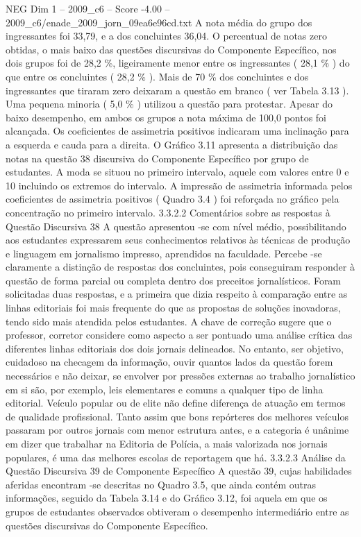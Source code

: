 \begin{textsample}{NEG Dim 1 – 2009\_c6 – Score -4.00 – 2009\_c6/enade\_2009\_jorn\_09ea6e96cd.txt}
A nota média do grupo dos ingressantes foi 33,79, e a dos concluintes 36,04.
O percentual de notas zero obtidas, o mais baixo das questões discursivas do Componente Específico, nos dois grupos foi de 28,2 \%, ligeiramente menor entre os ingressantes ( 28,1 \% ) do que entre os concluintes ( 28,2 \% ).
Mais de 70 \% dos concluintes e dos ingressantes que tiraram zero deixaram a questão em branco ( ver Tabela 3.13 ).
Uma pequena minoria ( 5,0 \% ) utilizou a questão para protestar.
Apesar do baixo desempenho, em ambos os grupos a nota máxima de 100,0 pontos foi alcançada.
Os coeficientes de assimetria positivos indicaram uma inclinação para a esquerda e cauda para a direita.
O Gráfico 3.11 apresenta a distribuição das notas na questão 38 discursiva do Componente Específico por grupo de estudantes.
A moda se situou no primeiro intervalo, aquele com valores entre 0 e 10 incluindo os extremos do intervalo.
A impressão de assimetria informada pelos coeficientes de assimetria positivos ( Quadro 3.4 ) foi reforçada no gráfico pela concentração no primeiro intervalo. 3.3.2.2 Comentários sobre as respostas à Questão Discursiva 38 A questão apresentou -se com nível médio, possibilitando aos estudantes expressarem seus conhecimentos relativos às técnicas de produção e linguagem em jornalismo impresso, aprendidos na faculdade.
Percebe -se claramente a distinção de respostas dos concluintes, pois conseguiram responder à questão de forma parcial ou completa dentro dos preceitos jornalísticos.
Foram solicitadas duas respostas, e a primeira que dizia respeito à comparação entre as linhas editoriais foi mais frequente do que as propostas de soluções inovadoras, tendo sido mais atendida pelos estudantes.
A chave de correção sugere que o professor, corretor considere como aspecto a ser pontuado uma análise crítica das diferentes linhas editoriais dos dois jornais delineados.
No entanto, ser objetivo, cuidadoso na checagem da informação, ouvir quantos lados da questão forem necessários e não deixar, se envolver por pressões externas ao trabalho jornalístico em si são, por exemplo, leis elementares e comuns a qualquer tipo de linha editorial.
Veículo popular ou de elite não define diferença de atuação em termos de qualidade profissional.
Tanto assim que bons repórteres dos melhores veículos passaram por outros jornais com menor estrutura antes, e a categoria é unânime em dizer que trabalhar na Editoria de Polícia, a mais valorizada nos jornais populares, é uma das melhores escolas de reportagem que há. 3.3.2.3 Análise da Questão Discursiva 39 de Componente Específico A questão 39, cujas habilidades aferidas encontram -se descritas no Quadro 3.5, que ainda contém outras informações, seguido da Tabela 3.14 e do Gráfico 3.12, foi aquela em que os grupos de estudantes observados obtiveram o desempenho intermediário entre as questões discursivas do Componente Específico.

\end{textsample}
